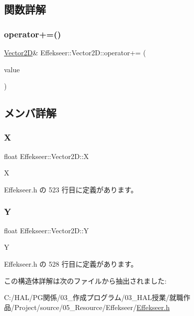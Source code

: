 \subsection{関数詳解}
\mbox{\label{struct_effekseer_1_1_vector2_d_aa86968d06d78c0a951e85f6a44b02f95}} 
\subsubsection{\texorpdfstring{operator+=()}{operator+=()}}
{\footnotesize\ttfamily \mbox{\hyperlink{struct_effekseer_1_1_vector2_d}{Vector2D}}\& Effekseer\+::\+Vector2\+D\+::operator+= (\begin{DoxyParamCaption}\item[{const \mbox{\hyperlink{struct_effekseer_1_1_vector2_d}{Vector2D}} \&}]{value }\end{DoxyParamCaption})}



\subsection{メンバ詳解}
\mbox{\label{struct_effekseer_1_1_vector2_d_ae84928d10dd54136f362361aad8fe4aa}} 
\subsubsection{\texorpdfstring{X}{X}}
{\footnotesize\ttfamily float Effekseer\+::\+Vector2\+D\+::X}



X 



 Effekseer.\+h の 523 行目に定義があります。

\mbox{\label{struct_effekseer_1_1_vector2_d_a648a6d6b86aaaeadc2302ae99d2d2768}} 
\subsubsection{\texorpdfstring{Y}{Y}}
{\footnotesize\ttfamily float Effekseer\+::\+Vector2\+D\+::Y}



Y 



 Effekseer.\+h の 528 行目に定義があります。



この構造体詳解は次のファイルから抽出されました\+:\begin{DoxyCompactItemize}
\item 
C\+:/\+H\+A\+L/\+P\+G関係/03\+\_\+作成プログラム/03\+\_\+\+H\+A\+L授業/就職作品/\+Project/source/05\+\_\+\+Resource/\+Effekseer/\mbox{\hyperlink{_effekseer_8h}{Effekseer.\+h}}\end{DoxyCompactItemize}
